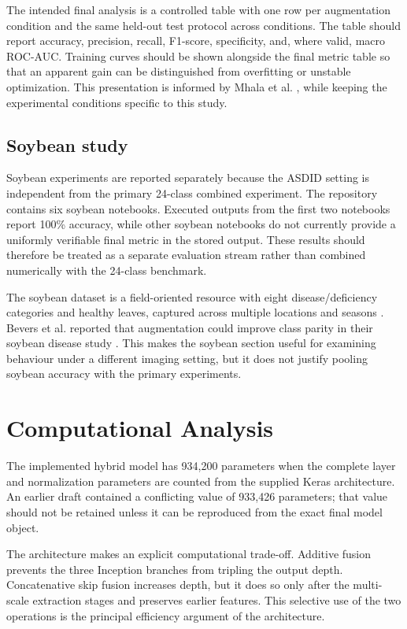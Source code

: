 \documentclass[a4paper,fleqn]{cas-dc}
\begin{document}
The intended final analysis is a controlled table with one row per augmentation condition and the same held-out test protocol across conditions. The table should report accuracy, precision, recall, F1-score, specificity, and, where valid, macro ROC-AUC. Training curves should be shown alongside the final metric table so that an apparent gain can be distinguished from overfitting or unstable optimization. This presentation is informed by Mhala et al. \cite{mhala2025}, while keeping the experimental conditions specific to this study.

\subsection{Soybean study}
Soybean experiments are reported separately because the ASDID setting is independent from the primary 24-class combined experiment. The repository contains six soybean notebooks. Executed outputs from the first two notebooks report 100\% accuracy, while other soybean notebooks do not currently provide a uniformly verifiable final metric in the stored output. These results should therefore be treated as a separate evaluation stream rather than combined numerically with the 24-class benchmark.

The soybean dataset is a field-oriented resource with eight disease/deficiency categories and healthy leaves, captured across multiple locations and seasons \cite{bevers2022,dryad2022}. Bevers et al. reported that augmentation could improve class parity in their soybean disease study \cite{bevers2022}. This makes the soybean section useful for examining behaviour under a different imaging setting, but it does not justify pooling soybean accuracy with the primary experiments.

\section{Computational Analysis}
The implemented hybrid model has 934,200 parameters when the complete layer and normalization parameters are counted from the supplied Keras architecture. An earlier draft contained a conflicting value of 933,426 parameters; that value should not be retained unless it can be reproduced from the exact final model object.

The architecture makes an explicit computational trade-off. Additive fusion prevents the three Inception branches from tripling the output depth. Concatenative skip fusion increases depth, but it does so only after the multi-scale extraction stages and preserves earlier features. This selective use of the two operations is the principal efficiency argument of the architecture.
\end{document}
